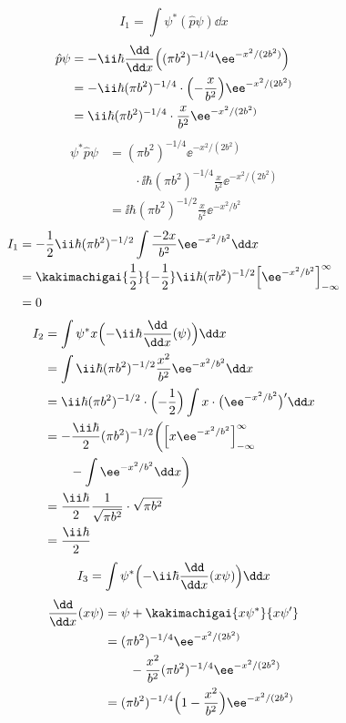 \[ I_{1}=\int\psi^{*}(\hat{p}\psi)\dd x \]
\begin{align*}
\hat{p}\psi&=-\ii\hbar\frac{\dd}{\dd x}\Bigl((\pi b^{2})^{-1/4}\ee^{-x^{2}/(2b^{2})}\Bigr)\\
&=-\ii\hbar(\pi b^{2})^{-1/4}\cdot\Bigl(-\frac{x}{b^{2}}\Bigr)\ee^{-x^{2}/(2b^{2})}\\
&=\ii\hbar(\pi b^{2})^{-1/4}\cdot\frac{x}{b^{2}}\ee^{-x^{2}/(2b^{2})}
\end{align*}
\begin{align*}
\psi^{*}\hat{p}\psi&=(\pi b^{2})^{-1/4}\ee^{-x^{2}/(2b^{2})}\\
&\qquad\cdot\ii\hbar(\pi b^{2})^{-1/4}\frac{x}{b^{2}}\ee^{-x^{2}/(2b^{2})}\\
&=\ii\hbar(\pi b^{2})^{-1/2}\frac{x}{b^{2}}\ee^{-x^{2}/b^{2}}
\end{align*}
\begin{align*}
I_{1}&=-\frac{1}{2}\ii\hbar(\pi b^{2})^{-1/2}\int\frac{-2x}{b^{2}}\ee^{-x^{2}/b^{2}}\dd x\\
&=\kakimachigai{\frac{1}{2}}{-\frac{1}{2}}\ii\hbar(\pi b^{2})^{-1/2}\Bigl[\ee^{-x^{2}/b^{2}}\Bigr]_{-\infty}^{\infty}\\
&=0
\end{align*}
\begin{align*}
I_{2}&=\int\psi^{*}x\Bigl(-\ii\hbar\frac{\dd}{\dd x}(\psi)\Bigr)\dd x\\
&=\int\ii\hbar(\pi b^{2})^{-1/2}\frac{x^{2}}{b^{2}}\ee^{-x^{2}/b^{2}}\dd x\\
&=\ii\hbar(\pi b^{2})^{-1/2}\cdot\Bigl(-\frac{1}{2}\Bigr)\int x\cdot\bigl(\ee^{-x^{2}/b^{2}}\bigr)'\dd x\\
&=-\frac{\ii\hbar}{2}(\pi b^{2})^{-1/2}\biggl(\Bigl[x\ee^{-x^{2}/b^{2}}\Bigr]_{-\infty}^{\infty}\\
&\qquad-\int\ee^{-x^{2}/b^{2}}\dd x\biggr)\\
&=\frac{\ii\hbar}{2}\frac{1}{\sqrt{\pi b^{2}}}\cdot\sqrt{\pi b^{2}}\\
&=\frac{\ii\hbar}{2}
\end{align*}
\[ I_{3}=\int\psi^{*}\Bigl(-\ii\hbar\frac{\dd}{\dd x}(x\psi)\Bigr)\dd x \]
\begin{align*}
\frac{\dd}{\dd x}(x\psi)&=\psi+\kakimachigai{x\psi^{*}}{x\psi'}\\
&=(\pi b^{2})^{-1/4}\ee^{-x^{2}/(2b^{2})}\\
&\qquad-\frac{x^{2}}{b^{2}}(\pi b^{2})^{-1/4}\ee^{-x^{2}/(2b^{2})}\\
&=(\pi b^{2})^{-1/4}\Bigl(1-\frac{x^{2}}{b^{2}}\Bigr)\ee^{-x^{2}/(2b^{2})}
\end{align*}
